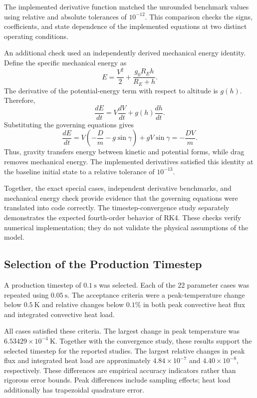 \documentclass[conf]{new-aiaa}
\begin{document}
The implemented derivative function matched the unrounded
benchmark values using relative and absolute tolerances
of $10^{-12}$. This comparison checks the signs, coefficients,
and state dependence of the implemented equations at two
distinct operating conditions.

An additional check used an independently derived mechanical
energy identity. Define the specific mechanical energy as
\begin{equation}
E =
\frac{V^2}{2}
+
\frac{g_0 R_E h}{R_E+h}.
\end{equation}
The derivative of the potential-energy term with respect to
altitude is $g(h)$. Therefore,
\begin{equation}
\frac{dE}{dt}
=
V\frac{dV}{dt}
+
g(h)\frac{dh}{dt}.
\end{equation}
Substituting the governing equations gives
\begin{equation}
\frac{dE}{dt}
=
V\left(-\frac{D}{m}-g\sin\gamma\right)
+
gV\sin\gamma
=
-\frac{DV}{m}.
\end{equation}
Thus, gravity transfers energy between kinetic and potential
forms, while drag removes mechanical energy. The implemented
derivatives satisfied this identity at the baseline initial
state to a relative tolerance of $10^{-13}$.

Together, the exact special cases, independent derivative benchmarks, and mechanical
energy check provide evidence that the governing equations
were translated into code correctly. The timestep-convergence
study separately demonstrates the expected fourth-order
behavior of RK4. These checks verify numerical implementation;
they do not validate the physical assumptions of the model.
\subsection{Selection of the Production Timestep}

A production timestep of $0.1~\mathrm{s}$ was selected.
Each of the 22 parameter cases was repeated using
$0.05~\mathrm{s}$. The acceptance criteria were a
peak-temperature change below $0.5~\mathrm{K}$ and
relative changes below $0.1\%$ in both peak convective
heat flux and integrated convective heat load.

All cases satisfied these criteria. The largest change
in peak temperature was $6.53429\times10^{-4}~\mathrm{K}$.
Together with the convergence study, these results
support the selected timestep for the reported studies. The largest relative
changes in peak flux and integrated heat load are approximately
$4.84\times10^{-7}$ and $4.40\times10^{-8}$, respectively. These differences
are empirical accuracy indicators rather than rigorous error bounds. Peak
differences include sampling effects; heat load additionally has trapezoidal
quadrature error.
\end{document}
